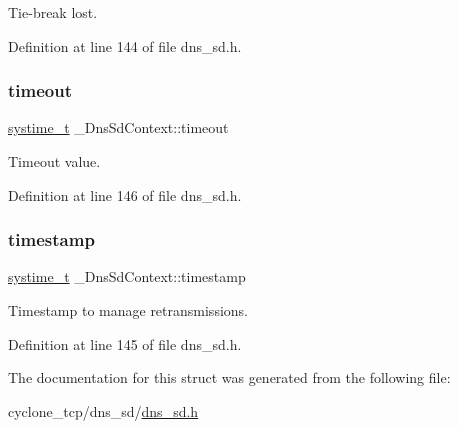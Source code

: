 Tie-\/break lost. 



Definition at line 144 of file dns\+\_\+sd.\+h.

\mbox{\label{struct__DnsSdContext_ab0cfde919cfcd7ebe5d15d2d1effba21}} 
\subsubsection{\texorpdfstring{timeout}{timeout}}
{\footnotesize\ttfamily \hyperlink{compiler__port_8h_ae3e32a98d431a02106616da3071832dd}{systime\+\_\+t} \+\_\+\+Dns\+Sd\+Context\+::timeout}



Timeout value. 



Definition at line 146 of file dns\+\_\+sd.\+h.

\mbox{\label{struct__DnsSdContext_aec4267367c8b45683171caeaeba3c342}} 
\subsubsection{\texorpdfstring{timestamp}{timestamp}}
{\footnotesize\ttfamily \hyperlink{compiler__port_8h_ae3e32a98d431a02106616da3071832dd}{systime\+\_\+t} \+\_\+\+Dns\+Sd\+Context\+::timestamp}



Timestamp to manage retransmissions. 



Definition at line 145 of file dns\+\_\+sd.\+h.



The documentation for this struct was generated from the following file\+:\begin{DoxyCompactItemize}
\item 
cyclone\+\_\+tcp/dns\+\_\+sd/\hyperlink{dns__sd_8h}{dns\+\_\+sd.\+h}\end{DoxyCompactItemize}
